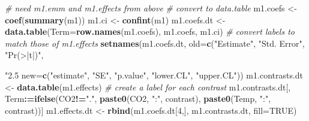\documentclass[]{book}
\newenvironment{Shaded}{\begin{snugshade}}{\end{snugshade}}
\newcommand{\KeywordTok}[1]{\textcolor[rgb]{0.13,0.29,0.53}{\textbf{#1}}}
\newcommand{\DataTypeTok}[1]{\textcolor[rgb]{0.13,0.29,0.53}{#1}}
\newcommand{\DecValTok}[1]{\textcolor[rgb]{0.00,0.00,0.81}{#1}}
\newcommand{\StringTok}[1]{\textcolor[rgb]{0.31,0.60,0.02}{#1}}
\newcommand{\CommentTok}[1]{\textcolor[rgb]{0.56,0.35,0.01}{\textit{#1}}}
\newcommand{\OtherTok}[1]{\textcolor[rgb]{0.56,0.35,0.01}{#1}}
\newcommand{\OperatorTok}[1]{\textcolor[rgb]{0.81,0.36,0.00}{\textbf{#1}}}
\newcommand{\ErrorTok}[1]{\textcolor[rgb]{0.64,0.00,0.00}{\textbf{#1}}}
\newcommand{\NormalTok}[1]{#1}
\begin{document}
\begin{Shaded}
\begin{Highlighting}[]
\CommentTok{# need m1.emm and m1.effects from above}
\CommentTok{# convert to data.table}
\NormalTok{m1.coefs <-}\StringTok{ }\KeywordTok{coef}\NormalTok{(}\KeywordTok{summary}\NormalTok{(m1))}
\NormalTok{m1.ci <-}\StringTok{ }\KeywordTok{confint}\NormalTok{(m1)}
\NormalTok{m1.coefs.dt <-}\StringTok{ }\KeywordTok{data.table}\NormalTok{(}\DataTypeTok{Term=}\KeywordTok{row.names}\NormalTok{(m1.coefs), m1.coefs, m1.ci)}
\CommentTok{# convert labels to match those of m1.effects}
\KeywordTok{setnames}\NormalTok{(m1.coefs.dt, }
         \DataTypeTok{old=}\KeywordTok{c}\NormalTok{(}\StringTok{"Estimate"}\NormalTok{, }\StringTok{"Std. Error"}\NormalTok{, }\StringTok{"Pr(>|t|)"}\NormalTok{, }\StringTok{"2.5 %
         \DataTypeTok{new=}\KeywordTok{c}\NormalTok{(}\StringTok{"estimate"}\NormalTok{, }\StringTok{"SE"}\NormalTok{, }\StringTok{"p.value"}\NormalTok{, }\StringTok{"lower.CL"}\NormalTok{, }\StringTok{"upper.CL"}\NormalTok{))}
\NormalTok{m1.contrasts.dt <-}\StringTok{ }\KeywordTok{data.table}\NormalTok{(m1.effects)}
\CommentTok{# create a label for each contrast}
\NormalTok{m1.contrasts.dt[, Term}\OperatorTok{:}\ErrorTok{=}\KeywordTok{ifelse}\NormalTok{(CO2}\OperatorTok{!=}\StringTok{"."}\NormalTok{, }
                              \KeywordTok{paste0}\NormalTok{(CO2, }\StringTok{":"}\NormalTok{, contrast), }
                              \KeywordTok{paste0}\NormalTok{(Temp, }\StringTok{":"}\NormalTok{, contrast))]}
\NormalTok{m1.effects.dt <-}\StringTok{ }\KeywordTok{rbind}\NormalTok{(m1.coefs.dt[}\DecValTok{4}\NormalTok{,], m1.contrasts.dt, }\DataTypeTok{fill=}\OtherTok{TRUE}\NormalTok{)}

}
\end{Highlighting}
\end{Shaded}
\end{document}
